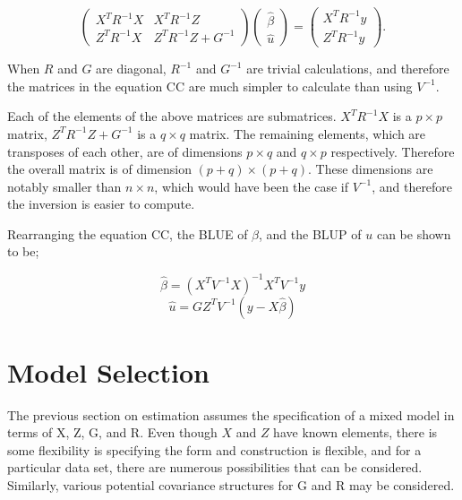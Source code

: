\documentclass[12pt, a4paper]{report}
\begin{document}
\begin{equation}
\left( \begin{matrix}
X^{T}R^{-1}X  & X^{T}R^{-1}Z \\
Z^{T}R^{-1}X  &  Z^{T}R^{-1}Z + G^{-1}
 \end{matrix}\right)  \left(
\begin{array}{c}
\hat{\beta}  \\
\hat{u}\end{array} \right) = \left(  \begin{array}{c}
X^{T}R^{-1}y  \\
Z^{T}R^{-1}y  \end{array} \right).
\end{equation}

When $R$ and $G$ are diagonal, $R^{-1}$ and $G^{-1}$ are trivial
calculations, and therefore the matrices in the equation CC are
much simpler to calculate than using $V^{-1}$.

Each of the elements of the above matrices are submatrices.
$X^{T}R^{-1}X$ is a $p \times p$ matrix, $Z^{T}R^{-1}Z + G^{-1}$
is a $q \times q$ matrix. The remaining elements, which are
transposes of each other, are of dimensions $p \times q$ and $q
\times p$ respectively. Therefore the overall matrix is of
dimension $(p+q) \times (p+q)$. These dimensions are notably
smaller than $n \times n$, which would have been the case if
$V^{-1}$, and therefore the inversion is easier to compute.

Rearranging the equation CC, the BLUE of $\beta$, and the BLUP of
$u$ can be shown to be;

\begin{equation}
\hat{\beta} = (X^{T}V^{-1}X)^{-1}X^{T}V^{-1}y
\end{equation}
\begin{equation}
\hat{u} = GZ^{T}V^{-1}(y-X\hat{\beta})
\end{equation}

\newpage

\section{Model Selection} The previous section on estimation assumes
the specification of a mixed model in terms of X, Z, G, and R.
Even though $X$ and $Z$ have known elements, there is some
flexibility is specifying the form and construction is flexible,
and for a particular data set, there are numerous possibilities
that can be considered. Similarly, various potential covariance
structures for G and R may be considered.
\end{document}
